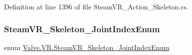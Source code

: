 Definition at line 1396 of file Steam\+V\+R\+\_\+\+Action\+\_\+\+Skeleton.\+cs.

\mbox{\label{namespace_valve_1_1_v_r_a99f7cc968994699a7485078bafddac17}} 
\subsubsection{\texorpdfstring{SteamVR\_Skeleton\_JointIndexEnum}{SteamVR\_Skeleton\_JointIndexEnum}}
{\footnotesize\ttfamily enum \mbox{\hyperlink{namespace_valve_1_1_v_r_a99f7cc968994699a7485078bafddac17}{Valve.\+V\+R.\+Steam\+V\+R\+\_\+\+Skeleton\+\_\+\+Joint\+Index\+Enum}}\hspace{0.3cm}{\ttfamily [strong]}}

